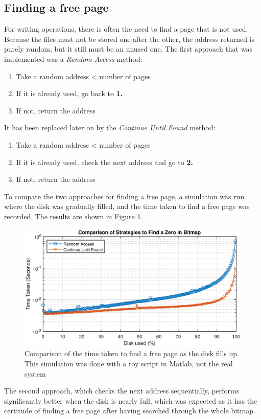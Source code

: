 \documentclass[10pt,a4paper]{ULBreport}
\begin{document}
\subsection{Finding a free page}
For writing operations, there is often the need to find a page that is not used. Because the files must not be stored one after the other, the address returned is purely random, but it still must be an unused one. The first approach that was implemented was a \textit{Random Access} method:
\begin{enumerate}
    \item Take a random address < number of pages
    \item If it is already used, go back to \textbf{1.}
    \item If not, return the address
\end{enumerate}
It has been replaced later on by the \textit{Continue Until Found} method:
\begin{enumerate}
    \item Take a random address < number of pages
    \item If it is already used, check the next address and go to \textbf{2.}
    \item If not, return the address
\end{enumerate}
To compare the two approaches for finding a free page, a simulation was run where the disk was gradually filled, and the time taken to find a free page was recorded. The results are shown in Figure \ref{fig:findFreePageTime}. \\
\begin{figure}
    \centering
    \includegraphics[width=1\textwidth]{findFreePage.eps}
    \caption{Comparison of the time taken to find a free page as the disk fills up. This simulation was done with a toy script in Matlab, not the real system}
    \label{fig:findFreePageTime}
\end{figure}
The second approach, which checks the next address sequentially, performs significantly better when the disk is nearly full, which was expected as it has the certitude of finding a free page after having searched through the whole bitmap.
\end{document}
